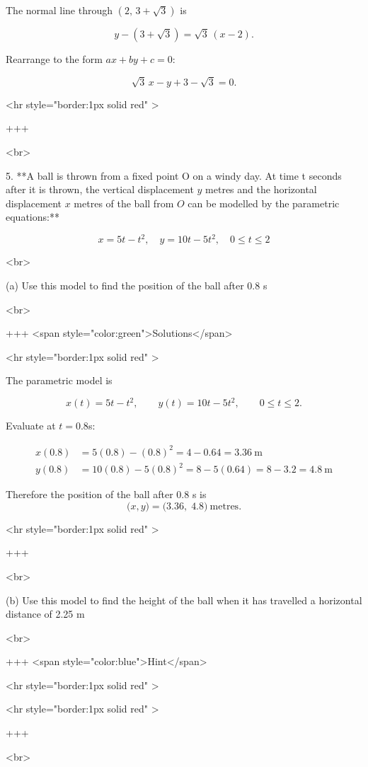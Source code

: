 The normal line through $(2,\,3+\sqrt{3})$ is

$$
y-(3+\sqrt{3})=\sqrt{3}\,(x-2).
$$

Rearrange to the form $ax+by+c=0$:

$$
\sqrt{3}\,x - y + 3 - \sqrt{3} = 0.
$$

<hr style="border:1px solid red" >

+++

<br>


5. **A ball is thrown from a fixed point O on a windy day. At time t seconds after it is thrown, the vertical displacement $y$ metres and the horizontal displacement $x$ metres of the ball from $O$ can be modelled by the parametric equations:**

$$
x=5 t-t^{2}, \quad y=10 t-5 t^{2}, \quad 0 \leq t \leq 2
$$

<br>

(a) Use this model to find the position of the ball after 0.8 s

<br>

+++ <span style="color:green">Solutions</span>

<hr style="border:1px solid red" >

The parametric model is

$$
x(t)=5t-t^{2},\qquad y(t)=10t-5t^{2},\qquad 0\le t\le 2.
$$

Evaluate at $t=0.8$s:

$$
\begin{align*}
x(0.8) &= 5(0.8) - (0.8)^2 = 4 - 0.64 = 3.36\ \text{m}\\
y(0.8) &= 10(0.8) - 5(0.8)^2 = 8 - 5(0.64) = 8 - 3.2 = 4.8\ \text{m}
\end{align*}
$$

Therefore the position of the ball after $0.8$ s is
$$
\bigl(x,y\bigr) = \bigl(3.36,\;4.8\bigr)\ \text{metres}.
$$

<hr style="border:1px solid red" >

+++

<br>

(b) Use this model to find the height of the ball when it has travelled a horizontal distance of 2.25 m

<br>

+++ <span style="color:blue">Hint</span>

<hr style="border:1px solid red" >

<hr style="border:1px solid red" >

+++

<br>

